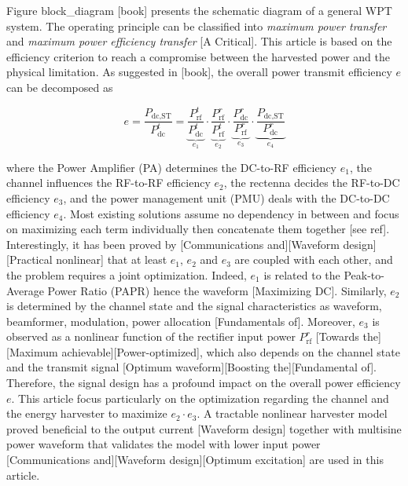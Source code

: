 Figure {block_diagram} [book] presents the schematic diagram of a general WPT system. The operating principle can be classified into \textit{maximum power transfer} and \textit{maximum power efficiency transfer} [A Critical]. This article is based on the efficiency criterion to reach a compromise between the harvested power and the physical limitation. As suggested in [book], the overall power transmit efficiency $e$ can be decomposed as

\begin{equation}\label{eqn:power_utilization_efficiency}
  e = \frac{{{P_{{\text{dc}},{\text{ST}}}}}}{{P_{{\text{dc}}}^t}} = \underbrace {\frac{{P_{{\text{rf}}}^t}}{{P_{{\text{dc}}}^t}}}_{{e_1}} \cdot \underbrace {\frac{{P_{{\text{rf}}}^r}}{{P_{{\text{rf}}}^t}}}_{{e_2}} \cdot \underbrace {\frac{{P_{{\text{dc}}}^r}}{{P_{{\text{rf}}}^r}}}_{{e_3}} \cdot \underbrace {\frac{{{P_{{\text{dc}},{\text{ST}}}}}}{{P_{{\text{dc}}}^r}}}_{{e_4}}
\end{equation}

where the Power Amplifier (PA) determines the DC-to-RF efficiency ${e_1}$, the channel influences the RF-to-RF efficiency ${e_2}$, the rectenna decides the RF-to-DC efficiency ${e_3}$, and the power management unit (PMU) deals with the DC-to-DC efficiency ${e_4}$. Most existing solutions assume no dependency in between and focus on maximizing each term individually then concatenate them together [see ref]. Interestingly, it has been proved by [Communications and][Waveform design][Practical nonlinear] that at least ${e_1}$, ${e_2}$ and ${e_3}$ are coupled with each other, and the problem requires a joint optimization. Indeed, ${e_1}$ is related to the Peak-to-Average Power Ratio (PAPR) hence the waveform [Maximizing DC]. Similarly, ${e_2}$ is determined by the channel state and the signal characteristics as waveform, beamformer, modulation, power allocation [Fundamentals of]. Moreover, ${e_3}$ is observed as a nonlinear function of the rectifier input power ${P_{{\text{rf}}}^r}$ [Towards the][Maximum achievable][Power-optimized], which also depends on the channel state and the transmit signal [Optimum waveform][Boosting the][Fundamental of]. Therefore, the signal design has a profound impact on the overall power efficiency $e$. This article focus particularly on the optimization regarding the channel and the energy harvester to maximize ${e_2} \cdot {e_3}$. A tractable nonlinear harvester model proved beneficial to the output current [Waveform design] together with multisine power waveform that validates the model with lower input power [Communications and][Waveform design][Optimum excitation] are used in this article.